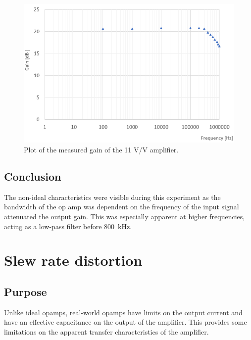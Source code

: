 \documentclass{report}
\begin{document}
\begin{figure}[h]
	\centering
	\includegraphics[width=0.7\linewidth]{exp1graph}
	\caption{Plot of the measured gain of the 11 V/V amplifier.}
	\label{fig:exp1graph}
\end{figure}


\subsection{Conclusion}
The non-ideal characteristics were visible during this experiment as the bandwidth of the op amp was dependent on the frequency of the input signal attenuated the output gain. This was especially apparent at higher frequencies, acting as a low-pass filter before \SI{800}{\kHz}.


\section{Slew rate distortion}

\subsection{Purpose}
Unlike ideal opamps, real-world opamps have limits on the output current and have an effective capacitance on the output of the amplifier. This provides some limitations on the apparent transfer characteristics of the amplifier.


\end{document}
